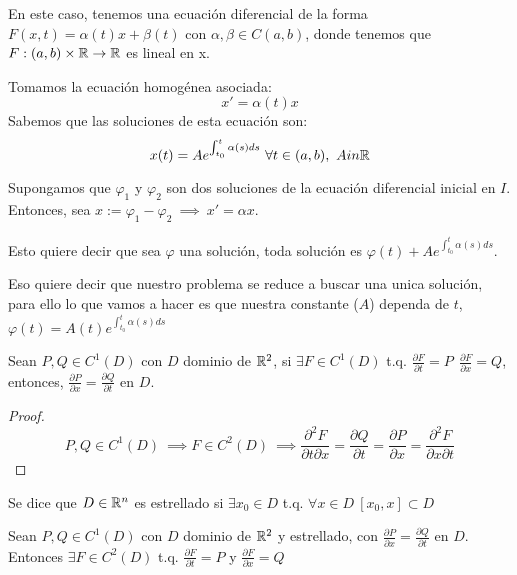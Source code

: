En este caso, tenemos una ecuación diferencial de la forma $F(x,t) = \alpha (t)x + \beta ( t)$ con $\alpha , \beta \in C(a,b)$, donde tenemos que $F:(a,b)\times \mathbb{R} \to \mathbb{R}$ es lineal en x.

Tomamos la ecuación homogénea asociada:
\[
x' = \alpha (t) x
\]
Sabemos que las soluciones de esta ecuación son:
\[
x(t) = A e^{\int_{t_0}^{t} \alpha (s) ds}  \ \forall t \in (a,b), \ A in \R
\]

Supongamos que $\varphi _1$ y $\varphi _2 $ son dos soluciones de la ecuación diferencial inicial en $I$. Entonces, sea $x := \varphi _1  - \varphi _2  \ \implies \ x' = \alpha x$.

Esto quiere decir que sea $\varphi$ una solución, toda solución es $\varphi (t) + A e^{\int_{t_0}^{t} \alpha (s) ds}$.

Eso quiere decir que nuestro problema se reduce a buscar una unica solución, para ello lo que vamos a hacer es que nuestra constante ($A$) dependa de $t$, $\varphi (t) = A(t) e^{\int_{t_0}^{t} \alpha (s) ds}$



\begin{nprop}
Sean $P,Q \in C^1(D)$ con $D$ dominio de $\mathbb{R}^2$, si $\exists F\in C^1 (D)$ t.q. $\frac{\partial F}{\partial t} = P \ \ \frac{\partial F}{\partial x} = Q$, entonces, $\frac{\partial P}{\partial x} = \frac{\partial Q}{\partial t}$ en $D$.
\end{nprop}

\begin{proof}
\[
P,Q \in C^1 (D) \ \implies F \in C^2 (D) \ \implies \frac{\partial ^2 F}{\partial t \partial x} = \frac{\partial Q}{\partial t} = \frac{\partial P}{\partial x} = \frac{\partial ^2 F}{\partial x \partial t}
\]
\end{proof}

\begin{ndef}
Se dice que $D \in \mathbb{R} ^n$ es estrellado si $\exists x_0 \in D$ t.q. $\forall x \in D \ [x_0, x] \subset D$
\end{ndef}

\begin{nth}
Sean $P,Q \in C^1(D)$ con $D$ dominio de $\mathbb{R}^2$ y estrellado, con $\frac{\partial P}{\partial x} = \frac{\partial Q}{\partial t}$ en $D$.
Entonces $\exists F \in C^2 (D)$ t.q. $\frac{\partial F}{\partial t} = P$ y $\frac{\partial F}{\partial x} = Q$
\end{nth}

